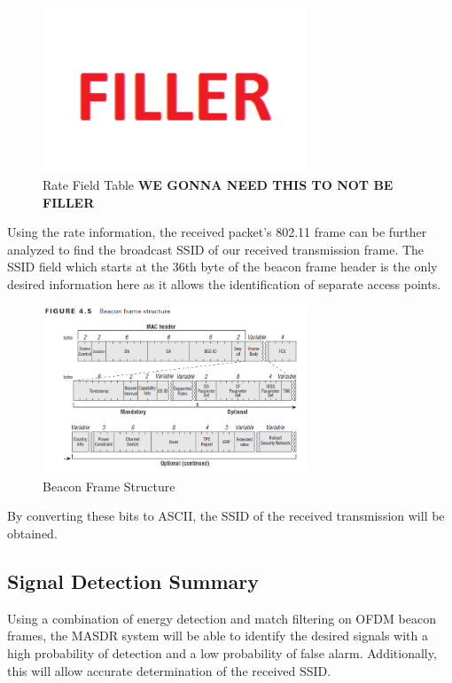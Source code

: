 \begin{figure}[ht!]
	\centering
	\includegraphics[width=0.70\textwidth]{img/filler}
	\caption{Rate Field Table \textbf{WE GONNA NEED THIS TO NOT BE FILLER}}
	\label{fig:ofdm_rate_table}
\end{figure}\par
Using the rate information, the received packet's 802.11 frame can be further analyzed to find the broadcast SSID of our received transmission frame. The SSID field which starts at the 36th byte of the beacon frame header is the only desired information here as it allows the identification of separate access points.
\begin{figure}[ht!]
	\centering
	\includegraphics[width=0.70\textwidth]{img/beacon_frame}
	\caption{Beacon Frame Structure}
	\label{fig:beacon_frame}
\end{figure}\par
By converting these bits to ASCII, the SSID of the received transmission will be obtained.
\subsection{Signal Detection Summary}
Using a combination of energy detection and match filtering on OFDM beacon frames, the MASDR system will be able to identify the desired signals with a high probability of detection and a low probability of false alarm. Additionally, this will allow accurate determination of the received SSID.

